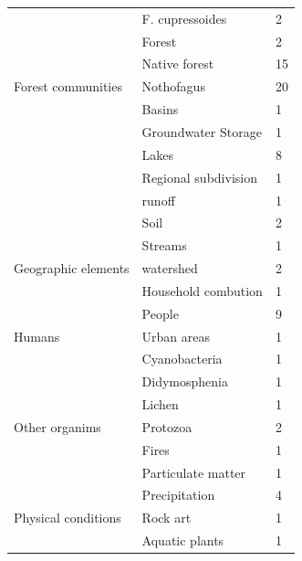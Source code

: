 \documentclass[]{article}
\begin{document}
\begin{table}
\begin{tabular}[t]{lll}
 & F. cupressoides & 2\\

 & Forest & 2\\

 & Native forest & 15\\

\multirow{-7}{*}{\raggedright\arraybackslash Forest communities} & Nothofagus & 20\\
\cmidrule{1-3}
 & Basins & 1\\

 & Groundwater Storage & 1\\

 & Lakes & 8\\

 & Regional subdivision & 1\\

 & runoff & 1\\

 & Soil & 2\\

 & Streams & 1\\

\multirow{-8}{*}{\raggedright\arraybackslash Geographic elements} & watershed & 2\\
\cmidrule{1-3}
 & Household combution & 1\\

 & People & 9\\

\multirow{-3}{*}{\raggedright\arraybackslash Humans} & Urban areas & 1\\
\cmidrule{1-3}
 & Cyanobacteria & 1\\

 & Didymosphenia & 1\\

 & Lichen & 1\\

\multirow{-4}{*}{\raggedright\arraybackslash Other organims} & Protozoa & 2\\
\cmidrule{1-3}
 & Fires & 1\\

 & Particulate matter & 1\\

 & Precipitation & 4\\

\multirow{-4}{*}{\raggedright\arraybackslash Physical conditions} & Rock art & 1\\
\cmidrule{1-3}
 & Aquatic plants & 1\\


\end{tabular}
\end{table}
\end{document}
